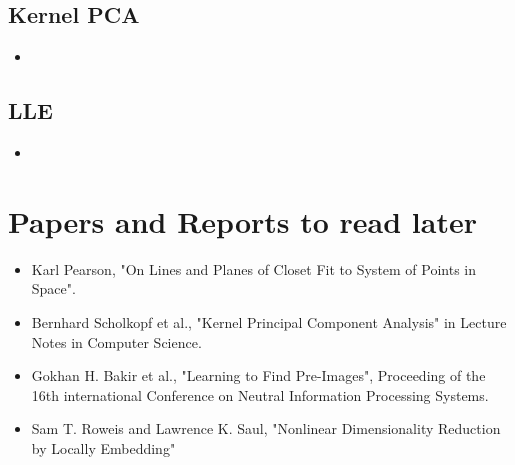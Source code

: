 \documentclass{article}
\begin{document}
	\subsection{Kernel PCA}
	\begin{itemize}
		\item 
	\end{itemize}
	\subsection{LLE}
	\begin{itemize}
		\item 
	\end{itemize}									
    \section*{Papers and Reports to read later}
    \begin{itemize}
    	\item Karl Pearson, "On Lines and Planes of Closet Fit to System of Points in Space".
    	\item Bernhard Scholkopf et al., "Kernel Principal Component Analysis" in Lecture Notes in Computer Science.
    	\item Gokhan H. Bakir et al., "Learning to Find Pre-Images", Proceeding of the 16th international Conference on Neutral Information Processing Systems.
    	\item Sam T. Roweis and Lawrence K. Saul, "Nonlinear Dimensionality Reduction by Locally Embedding"
    \end{itemize}
\end{document}
